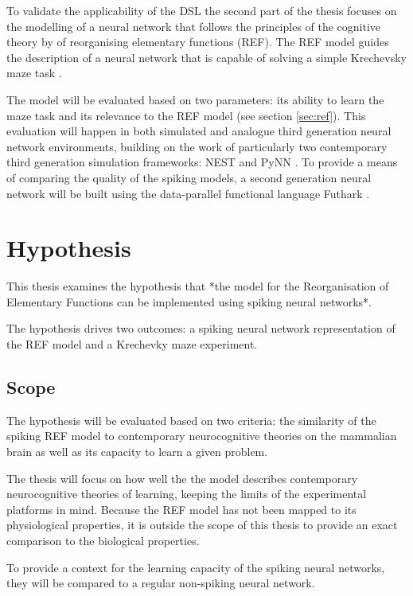 \documentclass[report.tex]{subfiles}
\begin{document}
To validate the applicability of the \gls{DSL} the second part of 
the thesis focuses on the modelling of a neural network that follows
the principles of the cognitive theory by \textcite{Mogensen2011} of
reorganising elementary functions (\gls{REF}).
The \gls{REF} model guides the description of a neural network
that is capable of solving a simple Krechevsky maze task 
\autocite{Krechevsky1932}.

The model will be evaluated based on two parameters: 
its ability to  learn the maze task and its relevance to the 
\gls{REF} model (see section \ref{sec:ref}).
This evaluation will happen in both simulated and analogue
third generation neural network environments, building on the
work of particularly two contemporary third generation simulation
frameworks: NEST and PyNN \autocite{Davison2009}.
To provide a means of comparing the quality of the spiking models,
a second generation neural network will be built using the
data-parallel functional language Futhark \autocite{Henriksen2017}.

\section{Hypothesis}
This thesis examines the hypothesis that *the model for the Reorganisation
of Elementary Functions can be implemented using spiking neural networks*.

The hypothesis drives two outcomes: a spiking neural network
representation of the REF model and a Krechevky maze experiment.

\subsection{Scope}
The hypothesis will be evaluated based on two criteria: the similarity of
the spiking REF model to contemporary neurocognitive theories on the
mammalian brain as well as its capacity to learn a given problem.

The thesis will focus on how well the the model describes contemporary
neurocognitive theories of learning, keeping the limits of the
experimental platforms in mind.
Because the REF model has not been mapped to its physiological
properties, it is outside the scope of this thesis to provide an exact
comparison to the biological properties.

To provide a context for the learning capacity of the spiking neural networks, they will be compared to a regular non-spiking neural network.
\end{document}
